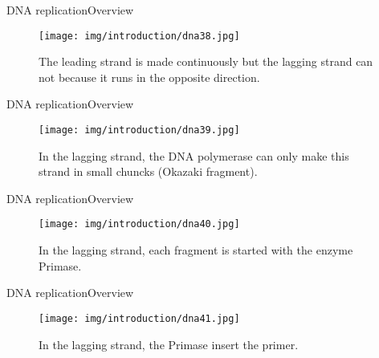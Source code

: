 \documentclass[10pt]{beamer}
\newcommand{\1}{
	\setbeamertemplate{background}{
		\texttt{[image: img/1]}
		\tikz[overlay] \fill[fill opacity=0.75,fill=white] (0,0) rectangle (-\paperwidth,\paperheight);
	}
}
\begin{document}
\begin{frame}{DNA replication}{Overview}
	\begin{figure}[]
		\centering
		\texttt{[image: img/introduction/dna38.jpg]}
		\label{img:mot2}
		\caption{The leading strand is made continuously but the lagging strand can not because it runs in the opposite direction.}
	\end{figure}
\end{frame}


\begin{frame}{DNA replication}{Overview}
	\begin{figure}[]
		\centering
		\texttt{[image: img/introduction/dna39.jpg]}
		\label{img:mot2}
		\caption{In the lagging strand, the DNA polymerase can only make this strand in small chuncks (Okazaki fragment). }
	\end{figure}
\end{frame}

\begin{frame}{DNA replication}{Overview}
	\begin{figure}[]
		\centering
		\texttt{[image: img/introduction/dna40.jpg]}
		\label{img:mot2}
		\caption{In the lagging strand, each fragment is started with the enzyme Primase. }
	\end{figure}
\end{frame}

\begin{frame}{DNA replication}{Overview}
	\begin{figure}[]
		\centering
		\texttt{[image: img/introduction/dna41.jpg]}
		\label{img:mot2}
		\caption{In the lagging strand, the Primase insert the primer. }
	\end{figure}
\end{frame}
\end{document}
